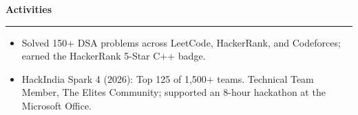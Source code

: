 \documentclass[11pt,a4paper]{article}
\newcommand{\sectionline}[1]{\vspace{6pt}\textbf{#1}\par\vspace{2pt}\hrule\vspace{3pt}}
\begin{document}
\sectionline{Activities}
\begin{itemize}
  \item Solved 150+ DSA problems across LeetCode, HackerRank, and Codeforces; earned the HackerRank 5-Star C++ badge.
  \item HackIndia Spark 4 (2026): Top 125 of 1,500+ teams. Technical Team Member, The Elites Community; supported an 8-hour hackathon at the Microsoft Office.
\end{itemize}
\end{document}
